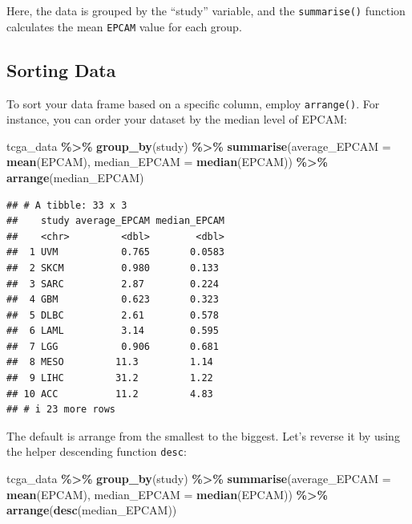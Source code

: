 \documentclass[
]{book}
\newenvironment{Shaded}{\begin{snugshade}}{\end{snugshade}}
\newcommand{\AttributeTok}[1]{\textcolor[rgb]{0.13,0.29,0.53}{#1}}
\newcommand{\FunctionTok}[1]{\textcolor[rgb]{0.13,0.29,0.53}{\textbf{#1}}}
\newcommand{\NormalTok}[1]{#1}
\newcommand{\SpecialCharTok}[1]{\textcolor[rgb]{0.81,0.36,0.00}{\textbf{#1}}}
\begin{document}
Here, the data is grouped by the ``study'' variable, and the \texttt{summarise()} function calculates the mean \texttt{EPCAM} value for each group.

\hypertarget{sorting-data}{%
\subsection{Sorting Data}\label{sorting-data}}

To sort your data frame based on a specific column, employ \texttt{arrange()}. For instance, you can order your dataset by the median level of EPCAM:

\begin{Shaded}
\begin{Highlighting}[]
\NormalTok{tcga\_data }\SpecialCharTok{\%\textgreater{}\%}
  \FunctionTok{group\_by}\NormalTok{(study) }\SpecialCharTok{\%\textgreater{}\%}
  \FunctionTok{summarise}\NormalTok{(}\AttributeTok{average\_EPCAM =} \FunctionTok{mean}\NormalTok{(EPCAM),}
            \AttributeTok{median\_EPCAM =} \FunctionTok{median}\NormalTok{(EPCAM)) }\SpecialCharTok{\%\textgreater{}\%}
  \FunctionTok{arrange}\NormalTok{(median\_EPCAM)}
\end{Highlighting}
\end{Shaded}

\begin{verbatim}
## # A tibble: 33 x 3
##    study average_EPCAM median_EPCAM
##    <chr>         <dbl>        <dbl>
##  1 UVM           0.765       0.0583
##  2 SKCM          0.980       0.133 
##  3 SARC          2.87        0.224 
##  4 GBM           0.623       0.323 
##  5 DLBC          2.61        0.578 
##  6 LAML          3.14        0.595 
##  7 LGG           0.906       0.681 
##  8 MESO         11.3         1.14  
##  9 LIHC         31.2         1.22  
## 10 ACC          11.2         4.83  
## # i 23 more rows
\end{verbatim}

The default is arrange from the smallest to the biggest. Let's reverse it by using the helper descending function \texttt{desc}:

\begin{Shaded}
\begin{Highlighting}[]
\NormalTok{tcga\_data }\SpecialCharTok{\%\textgreater{}\%}
  \FunctionTok{group\_by}\NormalTok{(study) }\SpecialCharTok{\%\textgreater{}\%}
  \FunctionTok{summarise}\NormalTok{(}\AttributeTok{average\_EPCAM =} \FunctionTok{mean}\NormalTok{(EPCAM),}
            \AttributeTok{median\_EPCAM =} \FunctionTok{median}\NormalTok{(EPCAM)) }\SpecialCharTok{\%\textgreater{}\%}
  \FunctionTok{arrange}\NormalTok{(}\FunctionTok{desc}\NormalTok{(median\_EPCAM))}
\end{Highlighting}
\end{Shaded}
\end{document}
